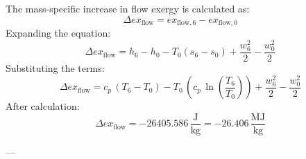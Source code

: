 The mass-specific increase in flow exergy is calculated as:  
\[
\Delta ex_{\text{flow}} = ex_{\text{flow},6} - ex_{\text{flow},0}
\]  
Expanding the equation:  
\[
\Delta ex_{\text{flow}} = h_6 - h_0 - T_0 (s_6 - s_0) + \frac{w_6^2}{2} - \frac{w_0^2}{2}
\]  
Substituting the terms:  
\[
\Delta ex_{\text{flow}} = c_p \, (T_6 - T_0) - T_0 \, (c_p \, \ln \left(\frac{T_6}{T_0}\right)) + \frac{w_6^2}{2} - \frac{w_0^2}{2}
\]  
After calculation:  
\[
\Delta ex_{\text{flow}} = -26405.586 \, \frac{\text{J}}{\text{kg}} = -26.406 \, \frac{\text{MJ}}{\text{kg}}
\]  

---